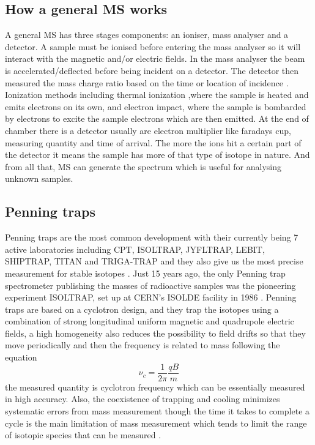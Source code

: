 \subsection{How a general MS works}
A general MS has three stages components: an ioniser, mass analyser and a detector.
A sample must be ionised before entering the mass analyser so it will interact with the magnetic and/or electric fields.
In the mass analyser the beam is accelerated/deflected before being incident on a detector.
The detector then measured the mass charge ratio based on the time or location of incidence \cite{noauthor_mass_nodate}.
Ionization methods including thermal ionization ,where the sample is heated and emits electrons on its own, and electron impact, where the sample is bombarded by electrons to excite the sample electrons which are then emitted.
At the end of chamber there is a detector usually are electron multiplier like faradays cup, measuring quantity and time of arrival.
The more the ions hit a certain part of the detector it means the sample has more of that type of isotope in nature.
And from all that, MS can generate the spectrum which is useful for analysing unknown samples.

\subsection{Penning traps}
Penning traps are the most common development with their currently being 7 active laboratories including CPT, ISOLTRAP, JYFLTRAP, LEBIT, SHIPTRAP, TITAN and TRIGA-TRAP and they also give us the most precise measurement for stable isotopes \cite{huang_ame_2021}.
Just 15 years ago, the only Penning trap spectrometer publishing the masses of radioactive samples was the pioneering experiment ISOLTRAP, set up at CERN’s ISOLDE facility in 1986 \cite{lunney_new_2019}.
Penning traps are based on a cyclotron design, and they trap the isotopes using a combination of strong longitudinal uniform magnetic and quadrupole electric fields, a high homogeneity also reduces the possibility to field drifts so that they move periodically and then the frequency is related to mass following the equation
\begin{equation}
    \nu_c = \frac{1}{2\pi}\frac{qB}{m}
\end{equation}
the measured quantity is cyclotron frequency which can be essentially measured in high accuracy.
Also, the coexistence of trapping and cooling minimizes systematic errors from mass measurement though the time it takes to complete a cycle is the main limitation of mass measurement which tends to limit the range of isotopic species that can be measured \cite{famiano_nuclear_2019}.

